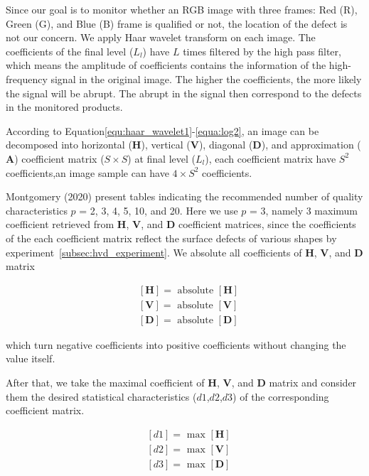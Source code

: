 Since our goal is to monitor whether an RGB image with three frames: Red (R), Green (G), and Blue (B) frame is qualified or not, the location of the defect is not our concern. We apply Haar wavelet transform on each image. The coefficients of the final level ($L_l$) have $L$ times filtered by the high pass filter, which means the amplitude of coefficients contains the information of the high-frequency signal in the original image. The higher the coefficients, the more likely the signal will be abrupt. The abrupt in the signal then correspond to the defects in the monitored products.


According to Equation\eqref{equ:haar_wavelet1}-\eqref{equa:log2}, an image can be decomposed into horizontal ($\mathbf{H}$), vertical ($\mathbf{V}$), diagonal ($\mathbf{D}$), and approximation ($\mathbf{A}$) coefficient matrix ($S \times S$) at final level ($L_l$), each coefficient matrix have $S^2$ coefficients,an image sample can have $4 \times S^2$ coefficients.

Montgomery (2020) present tables indicating the recommended number of quality characteristics $p$ = 2, 3, 4, 5, 10, and 20. Here we use $p$ = 3, namely 3 maximum coefficient retrieved from $\mathbf{H}$, $\mathbf{V}$, and $\mathbf{D}$ coefficient matrices, since the coefficients of the each coefficient matrix reflect the surface defects of various shapes by experiment~\ref{subsec:hvd_experiment}. We absolute all coefficients of $\mathbf{H}$, $\mathbf{V}$, and $\mathbf{D}$ matrix

\begin{equation}
\begin{aligned}
&{[\mathbf{H}]=\text { absolute }[\mathbf{H}]} \\
&{[\mathbf{V}]=\text { absolute }[\mathbf{V}]} \\
&{[\mathbf{D}]=\text { absolute }[\mathbf{D}]}
\end{aligned}
\label{equ:absD}
\end{equation}



which turn negative coefficients into positive coefficients without changing the value itself.


After that, we take the maximal coefficient of $\mathbf{H}$, $\mathbf{V}$, and $\mathbf{D}$ matrix and consider them the desired statistical characteristics ($d1$,$d2$,$d3$) of the corresponding coefficient matrix. 

\begin{equation}
\begin{aligned}
&{[d1]=\text { max }[\mathbf{H}]} \\
&{[d2]=\text { max }[\mathbf{V}]} \\
&{[d3]=\text { max }[\mathbf{D}]}
\end{aligned}
\label{equ:maxD}
\end{equation}

